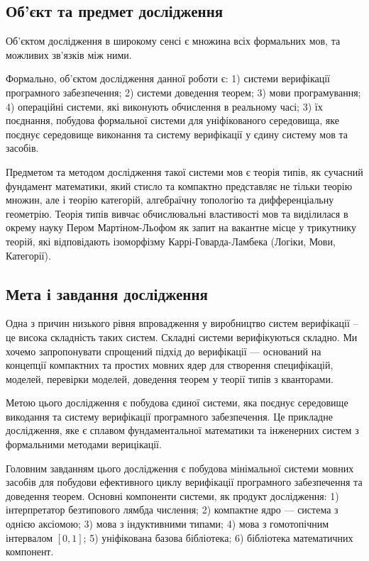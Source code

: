 \subsection{Об'єкт та предмет дослідження}
Об'єктом дослідження в широкому сенсі є множина
всіх формальних мов, та можливих зв'язків між ними.

Формально, об'єктом дослідження данної роботи є:
1) системи верифікації програмного забезпечення;
2) системи доведення теорем;
3) мови програмування;
4) операційні системи, які виконують обчислення в реальному часі;
3) їх поєднання, побудова формальної системи для
уніфікованого середовища, яке поєднує середовище
виконання та систему верифікації у єдину систему мов та засобів.

Предметом та методом дослідження такої системи мов є теорія типів,
як сучасний фундамент математики,
який стисло та компактно представляє не тільки теорію множин,
але і теорію категорій, алгебраїчну топологію та дифференціальну геометрію.
Теорія типів вивчає обчислювальні властивості мов та виділилася
в окрему науку Пером Мартіном-Льофом як запит на вакантне місце у
трикутнику теорій, які відповідають ізоморфізму
Каррі-Говарда-Ламбека (Логіки, Мови, Категорії).

\subsection{Мета і завдання дослідження}
Одна з причин низького рівня впровадження у виробництво систем
верифікації -- це висока складність таких систем. Складні системи
верифікуються складно. Ми хочемо запропонувати спрощений
підхід до верифікації --- оснований на концепції компактних
та простих мовних ядер для створення специфікацій, моделей,
перевірки моделей, доведення теорем у теорії типів з кванторами.

Метою цього дослідження є побудова єдиної системи, яка поєднує середовище
викодання та систему верифікації програмного забезпечення. Це прикладне дослідження,
яке є сплавом фундаментальної математики та інженерних
систем з формальними методами верицікації.

Головним завданням цього дослідження є побудова мінімальної системи
мовних засобів для побудови ефективного циклу верифікації програмного
забезпечення та доведення теорем. Основні компоненти системи, як продукт дослідження:
1) інтерпретатор безтипового лямбда числення;
2) компактне ядро --- система з однією аксіомою;
3) мова з індуктивними типами;
4) мова з гомотопічним інтервалом $[0,1]$;
5) уніфікована базова бібліотека;
6) бібліотека математичних компонент.

